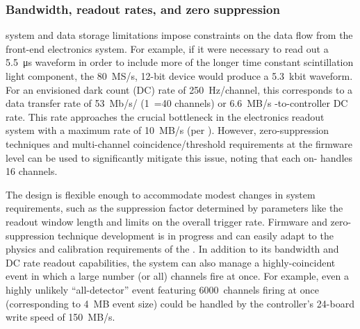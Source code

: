 
 
\subsubsection{Bandwidth, readout rates, and zero suppression}

 system and data storage limitations impose constraints on the  data flow from the front-end electronics system. 
For example, if it were necessary to read out a \SI{5.5}{\micro\second} waveform in order to include more of the longer time constant scintillation light component, the \SI{80}{MS/s}, 12-bit  device would produce a 5.3~kbit waveform. For an envisioned dark count (DC) rate of 250~Hz/channel, this corresponds to a data transfer rate of \SI{53}{Mb/s}/ (1~=40 channels) or \SI{6.6}{MB/s} -to-controller DC rate. This rate approaches the crucial bottleneck in the electronics readout system with a maximum rate of \SI{10}{MB/s} (per ). However, zero-suppression techniques and multi-channel coincidence/threshold requirements at the  firmware level can be used to significantly mitigate this issue, noting that each on-  handles 16 channels. 

The design is flexible enough to accommodate modest changes in system requirements, such as the suppression factor determined by parameters like the readout window length and limits on the overall trigger rate. 
Firmware and zero-suppression technique development is in progress and can easily adapt to the physics and calibration requirements of the .
In addition to its bandwidth and DC rate readout capabilities, the system can also  manage a highly-coincident event in which a large number (or all) channels fire at once. For example, even a highly unlikely ``all-detector'' event featuring 6000~channels firing at once (corresponding to \SI{4}{MB} event size) could be handled by the controller's 24-board write speed of \SI{150}{MB/s}. 


